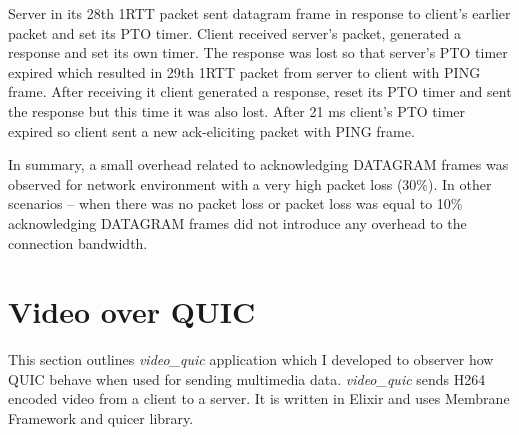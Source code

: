 
Server in its 28th 1RTT packet sent datagram frame in response to client's earlier packet and set its PTO timer.
Client received server's packet, generated a response and set its own timer.
The response was lost so that server's PTO timer expired which resulted in 29th 1RTT packet from server to client with PING frame.
After receiving it client generated a response, reset its PTO timer and sent the response but this time it was also lost.
After 21 ms client's PTO timer expired so client sent a new ack-eliciting packet with PING frame.

In summary, a small overhead related to acknowledging DATAGRAM frames was observed for network environment with a very
high packet loss (30\%).
In other scenarios -- when there was no packet loss or packet loss was equal to 10\% acknowledging DATAGRAM frames
did not introduce any overhead to the connection bandwidth.

\clearpage

\section{Video over QUIC}
\label{sec:video}
This section outlines \textit{video\_quic} application which I developed to observer how QUIC behave when used for
sending multimedia data.
\textit{video\_quic} sends H264 encoded video from a client to a server.
It is written in Elixir and uses Membrane Framework and quicer library.

